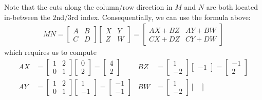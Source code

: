 \begin{solution}
Note that the cuts along the column/row direction in $M$ and $N$ are both located in-between the $2$nd/$3$rd index. Consequentially, we can use the formula above:
\begin{align*}
MN = 
\begin{bmatrix}
A & B \\
C & D
\end{bmatrix} 
\begin{bmatrix}
X & Y \\
Z & W
\end{bmatrix} 
=
\begin{bmatrix}
AX + BZ & AY + BW \\
CX + DZ & CY + DW
\end{bmatrix}
\end{align*}
which requires us to compute
\begin{align*}
AX &=
\begin{bmatrix}
1 & 2 \\
0 & 1
\end{bmatrix}
\begin{bmatrix}
0 \\
2 
\end{bmatrix}
=
\begin{bmatrix}
4 \\
2
\end{bmatrix}
&
BZ &=
\begin{bmatrix}
1 \\
-2
\end{bmatrix}
\begin{bmatrix}
-1
\end{bmatrix}
=
\begin{bmatrix}
-1 \\
2
\end{bmatrix} \\
AY &=
\begin{bmatrix}
1 & 2 \\
0 & 1
\end{bmatrix}
\begin{bmatrix}
1 \\
-1
\end{bmatrix}
=
\begin{bmatrix}
-1 \\
-1
\end{bmatrix}
&
BW &=
\begin{bmatrix}
1 \\
-2
\end{bmatrix}
\begin{bmatrix}

\end{bmatrix}
\end{align*}
\end{solution}
